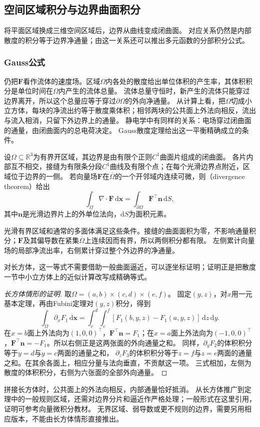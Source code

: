 \subsection{空间区域积分与边界曲面积分}

将平面区域换成三维空间区域后，边界从曲线变成闭曲面。
对应关系仍然是内部散度的积分等于边界净通量；由这一关系还可以推出多元函数的分部积分公式。

\subsubsection{Gauss公式}

仍把$\bm F$看作流体的速度场。区域$\Omega$内各处的散度给出单位体积的产生率，其体积积分是单位时间在$\Omega$内产生的流体总量。
流体总量守恒时，新产生的流体只能穿过边界离开，所以这个总量应等于穿过$\partial\Omega$的外向净通量。
从计算上看，把$\Omega$切成小立方体，每块的净流出约等于散度乘体积；相邻两块的公共面上外法向相反，流出与流入相消，只留下外边界上的通量。
静电学中有同样的关系：电场穿过闭曲面的通量，由闭曲面内的总电荷决定。
Gauss散度定理给出这一平衡精确成立的条件。
\begin{theorem}[Gauss散度定理]
\label{thm:analysis-divergence-theorem}
设$\Omega\subseteq\mathbb R^3$为有界开区域，其边界是由有限个正则$C^1$曲面片组成的闭曲面。
各片内部互不相交，接缝为有限条分段$C^1$曲线及有限个点；在每个光滑边界点附近，区域位于边界的一侧。
若向量场$\bm F$在$\overline\Omega$的一个开邻域内连续可微，则（divergence theorem）给出
\begin{equation}
  \int_{\Omega}\nabla\mathbin{\cdot}\bm F\,\mathrm d\bm x
  =\int_{\partial\Omega}\bm F^\top\bm n\,\mathrm dS,
 \label{eq:analysis-divergence-theorem}
\end{equation}
其中$\bm n$是光滑边界片上的外单位法向，$\mathrm dS$为面积元素。
\end{theorem}
光滑有界区域和通常的多面体满足这些条件。接缝的曲面面积为零，不影响通量积分；$\bm F$及其偏导数在紧集$\overline\Omega$上连续因而有界，所以两侧积分都有限。
左侧累计向量场的局部净流出率，右侧累计穿过整个外边界的净通量。

对长方体，这一等式不需要借助一般曲面逼近，可以逐坐标证明；证明正是把散度一节中小立方体上的近似计算改写成精确等式。
\begin{proof}[长方体情形的证明]
取$\Omega=(a,b)\times(c,d)\times(e,f)$。
固定$(y,z)$，对$x$用一元基本定理，再由Fubini定理对$(y,z)$积分，得到
\[
 \int_\Omega\partial_xF_1\,\mathrm d\bm x
 =\int_c^d\int_e^f
   [F_1(b,y,z)-F_1(a,y,z)]\,\mathrm dz\,\mathrm dy.
\]
在$x=b$面上外法向为$(1,0,0)^\top$，$\bm F^\top\bm n=F_1$；在$x=a$面上外法向为$(-1,0,0)^\top$，$\bm F^\top\bm n=-F_1$。所以右侧正是这两张面的外向通量之和。
同样，$\partial_yF_2$的体积积分等于$y=d$与$y=c$两面的通量之和，
$\partial_zF_3$的体积积分等于$z=f$与$z=e$两面的通量之和。在其余各面上，相应分量与法向垂直，不贡献这一项。
三式相加，左侧为散度的体积积分，右侧为六张面的全部外向通量。
\end{proof}
拼接长方体时，公共面上的外法向相反，内部通量恰好抵消。
从长方体推广到定理中的一般规则区域，还需对边界分片和逼近作严格处理；一般形式在这里引用，证明可参考向量微积分教材。
无界区域、弱导数或更不规则的边界，需要另用相应版本，不能由长方体情形直接推出。


